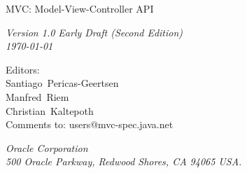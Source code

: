 \begin{titlepage}
\raggedleft

\vspace*{60pt}

{\Huge
\textsf{MVC: Model-View-Controller API}}

\vspace{20pt}

{
\Large\textit{Version 1.0 Early Draft (Second Edition)\\
\today}
}

\vspace{40pt}

{\large Editors:\\
Santiago\ Pericas-Geertsen\\
Manfred\ Riem\\
Christian\ Kaltepoth\\
\vspace{10pt}Comments to: users@mvc-spec.java.net
}

\vspace{80pt}

{\small\textit{Oracle Corporation\\
500 Oracle Parkway, Redwood Shores, CA 94065 USA.}
}
\end{titlepage} 
